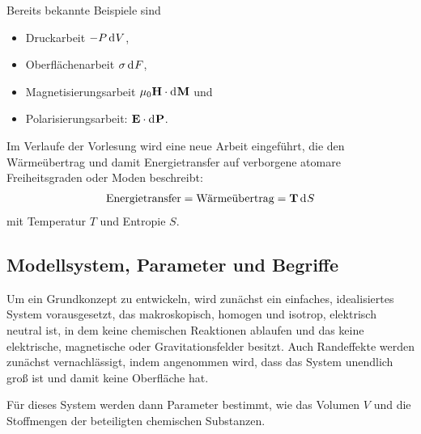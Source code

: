 Bereits bekannte Beispiele sind
\begin{itemize}
    \item Druckarbeit $-P\mathop{\mathrm{d}^{}V}$,
    \item Oberflächenarbeit $\sigma\mathop{\mathrm{d}^{}F}$,
    \item Magnetisierungsarbeit $\mu_0\mathbf{H}\cdot\mathop{\mathrm{d}^{}\mathbf{M}}$ und
    \item Polarisierungsarbeit: $\mathbf{E}\cdot\mathop{\mathrm{d}^{}\mathbf{P}}$.
\end{itemize}
Im Verlaufe der Vorlesung wird eine neue Arbeit eingeführt, die den Wärmeübertrag und damit Energietransfer auf verborgene atomare Freiheitsgraden oder Moden beschreibt:
\begin{align*}
    \text{Energietransfer}=\text{Wärmeübertrag}=\mathbf{T}\mathop{\mathrm{d}^{}S}
\end{align*}
mit Temperatur $T$ und Entropie $S$.



\subsection{Modellsystem, Parameter und Begriffe}

Um ein Grundkonzept zu entwickeln, wird zunächst ein einfaches, idealisiertes System vorausgesetzt, das makroskopisch, homogen und isotrop, elektrisch neutral ist, in dem keine chemischen Reaktionen ablaufen und das keine elektrische, magnetische oder Gravitationsfelder besitzt. Auch Randeffekte werden zunächst vernachlässigt, indem angenommen wird, dass das System unendlich groß ist und damit keine Oberfläche hat.

Für dieses System werden dann Parameter bestimmt, wie das Volumen $V$ und die Stoffmengen der beteiligten chemischen Substanzen.

